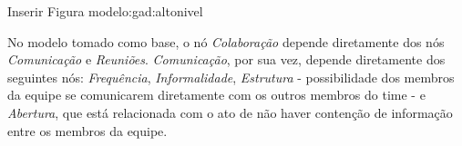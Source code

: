 {\color{red} Inserir Figura modelo:gad:altonivel}

No modelo tomado como base, o nó \textit{Colaboração} depende diretamente dos nós \textit{Comunicação} e \textit{Reuniões}. \textit{Comunicação}, por sua vez, depende diretamente dos seguintes nós: \textit{Frequência}, \textit{Informalidade}, \textit{Estrutura} - possibilidade dos membros da equipe se comunicarem diretamente com os outros membros do time - e \textit{Abertura}, que está relacionada com o ato de não haver contenção de informação entre os membros da equipe.

